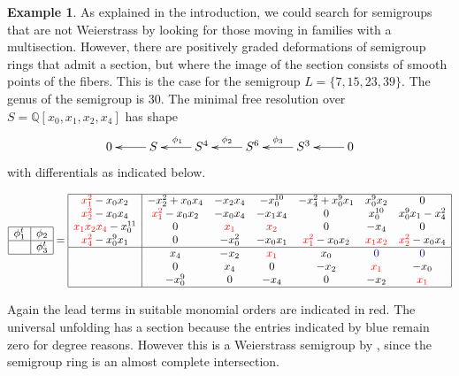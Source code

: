 \documentclass[twoside,12pt, leqno]{amsart}
\theoremstyle{definition}
\newtheorem{example}[theorem]{Example}
\def\QQ{{\mathbb Q}}
\begin{document}
\begin{example}\label{smooth section}
 As explained in the introduction, we could search for semigroups that are not Weierstrass by looking for those moving in families with a multisection. However, there are positively graded deformations of semigroup rings that admit a section, but where the image of the section
consists of smooth points of the fibers. This is the case for the semigroup
$L=\{7, 15, 23, 39\}$.
The genus of the semigroup is $30$. The minimal free resolution over $S=\QQ[x_{0},x_{1},x_{2},x_{4}]$ has shape
$$\xymatrix{ 
0 & \ar[l] S & \ar[l]_{\phi_{1}} S^{4} & \ar[l]_{\phi_{2}} S^{6} & \ar[l]_{\phi_{3}} S^{3} &\ar[l] 0 \cr}
$$
with differentials as indicated below.
\begin{tiny}
$$\begin{array}{|c|c|} \hline
               \phi_{1}^{t}& \phi_{2} \cr \hline
                                 & \phi_{3}^{t} \cr \hline
       \end{array}=
       \begin{array}{|c|ccc ccc|}\hline
{\color{red}x_{1}^{2}}-x_{0}x_{2}       & -x_{2}^{2}+x_{0}x_{4}&-x_{2}x_{4}&-x_{0}^{10}&-x_{4}^{2}+x_{0}^{9}x_{1}&x_{0}^{9}x_{2}&0\\
{\color{red}x_{2}^{2}}-x_{0}x_{4}        & {\color{red}x_{1}^{2}}-x_{0}x_{2}&-x_{0}x_{4}&-x_{1}x_{4}&0&x_{0}^{10}&x_{0}^{9}x_{1}-x_{4}^{2}\\
{\color{red}x_{1}x_{2}x_{4}}-x_{0}^{11}&  0&{\color{red}x_{1}}&{\color{red}x_{2}}&0&-x_{4}&0\\
{\color{red}x_{4}^{2}}-x_{0}^{9}x_{1} & 0  &-x_{0}^{2}&-x_{0}x_{1}&{\color{red}x_{1}^{2}}-x_{0}x_{2}&{\color{red}x_{1}x_{2}}&{\color{red}x_{2}^{2}}-x_{0}x_{4} \\ \hline
                                                         & x_{4}&-x_{2}&{\color{red}x_{1}}&x_{0}&{\color{blue}0}&{\color{blue}0}\\
                                                         &0&x_{4}&0&-x_{2}&{\color{red}x_{1}}&-x_{0}\\
                                                         &-x_{0}^{9}&0&-x_{4}&0&-x_{2}&{\color{red}x_{1}}\\ \hline
       \end{array}$$
\end{tiny}
Again the lead terms in suitable monomial orders are indicated in {\color{red}red}.
The universal unfolding has a section because the entries indicated by {\color{blue}blue} remain zero for degree reasons.
However this is a Weierstrass semigroup by \cite{Waldi80}, since the semigroup ring is an almost complete intersection.

\end{example}
\end{document}
